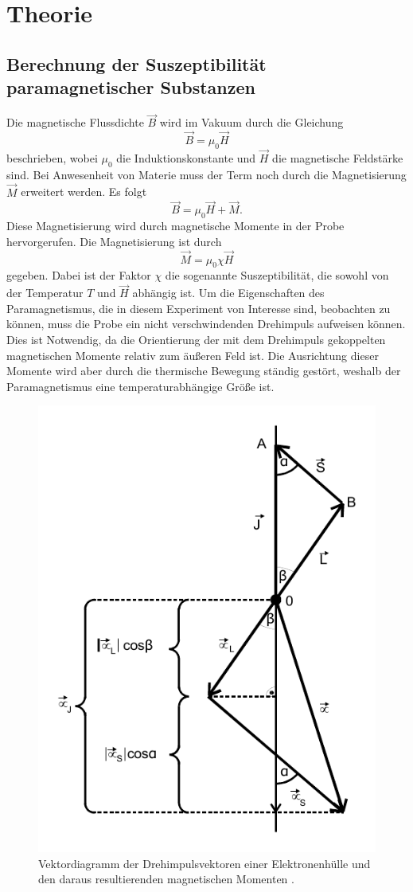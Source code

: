 \section{Theorie}
\label{sec:Theorie}

\subsection{Berechnung der Suszeptibilität paramagnetischer Substanzen}

Die magnetische Flussdichte $\vec{B}$ wird im Vakuum durch die Gleichung
\begin{equation*}
    \vec{B} = \mu_0 \vec{H}
\end{equation*}
beschrieben, wobei $\mu_0$ die Induktionskonstante und $\vec{H}$ die magnetische Feldstärke sind.
Bei Anwesenheit von Materie muss der Term noch durch die Magnetisierung $\vec{M}$ erweitert werden.
Es folgt
\begin{equation}
    \vec{B} = \mu_0 \vec{H} + \vec{M}.
\end{equation}
Diese Magnetisierung wird durch magnetische Momente in der Probe hervorgerufen.
Die Magnetisierung ist durch
\begin{equation}
    \vec{M} = \mu_0 \chi \vec{H}
\end{equation}
gegeben.
Dabei ist der Faktor $\chi$ die sogenannte Suszeptibilität, die sowohl von der Temperatur $T$ und $\vec{H}$ abhängig ist.
Um die Eigenschaften des Paramagnetismus, die in diesem Experiment von Interesse sind, beobachten zu können, muss die Probe ein nicht
verschwindenden Drehimpuls aufweisen können.
Dies ist Notwendig, da die Orientierung der mit dem Drehimpuls gekoppelten magnetischen Momente relativ zum äußeren Feld ist.
Die Ausrichtung dieser Momente wird aber durch die thermische Bewegung ständig gestört, weshalb der Paramagnetismus eine temperaturabhängige Größe ist.
\begin{figure}
    \centering
    \includegraphics[width= 0.4 \linewidth]{pictures/Zeichnung1.pdf}
    \caption{Vektordiagramm der Drehimpulsvektoren einer Elektronenhülle und den daraus resultierenden magnetischen Momenten \cite{v606}.}
    \label{fig:Zeichnung1}
\end{figure}

